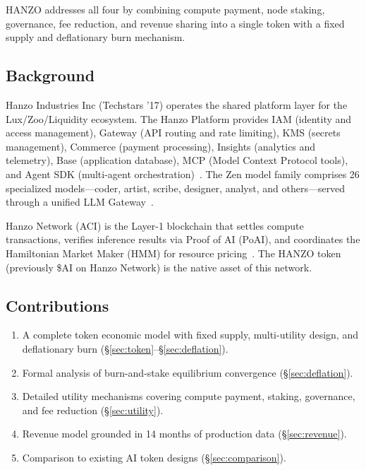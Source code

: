 \documentclass[11pt]{article}
\begin{document}
HANZO addresses all four by combining compute payment, node staking, governance,
fee reduction, and revenue sharing into a single token with a fixed supply and
deflationary burn mechanism.

\subsection{Background}

Hanzo Industries Inc (Techstars '17) operates the shared platform layer for the
Lux/Zoo/Liquidity ecosystem. The Hanzo Platform provides IAM (identity and access
management), Gateway (API routing and rate limiting), KMS (secrets management),
Commerce (payment processing), Insights (analytics and telemetry), Base
(application database), MCP (Model Context Protocol tools), and Agent SDK
(multi-agent orchestration)~\cite{hanzoplatform}. The Zen model family comprises
26 specialized models---coder, artist, scribe, designer, analyst, and
others---served through a unified LLM Gateway~\cite{hanzollmgateway}.

Hanzo Network (ACI) is the Layer-1 blockchain that settles compute transactions,
verifies inference results via Proof of AI (PoAI), and coordinates the
Hamiltonian Market Maker (HMM) for resource pricing~\cite{hanzoaci,
hanzonetwork}. The HANZO token (previously \$AI on Hanzo Network) is the native
asset of this network.

\subsection{Contributions}

\begin{enumerate}[leftmargin=1.4em]
    \item A complete token economic model with fixed supply, multi-utility design,
    and deflationary burn (\S\ref{sec:token}--\S\ref{sec:deflation}).
    \item Formal analysis of burn-and-stake equilibrium convergence
    (\S\ref{sec:deflation}).
    \item Detailed utility mechanisms covering compute payment, staking,
    governance, and fee reduction (\S\ref{sec:utility}).
    \item Revenue model grounded in 14 months of production data
    (\S\ref{sec:revenue}).
    \item Comparison to existing AI token designs (\S\ref{sec:comparison}).
\end{enumerate}
\end{document}

